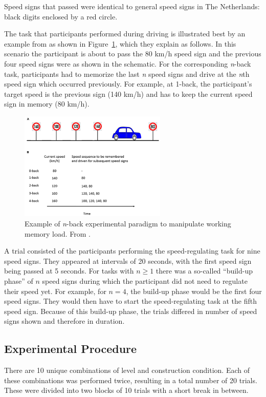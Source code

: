 Speed signs that passed were identical to general speed signs in The Netherlands: black digits enclosed by a red circle. 

The \nback task that participants performed during driving is illustrated best by an example from \citet{Unni2017} as shown in Figure~\ref{fig:nback_scheme}, which they explain as follows.
In this scenario the participant is about to pass the 80 km/h speed sign and the previous four speed signs were as shown in the schematic. 
For the corresponding \textit{n}-back task, participants had to memorize the last \textit{n} speed signs and drive at the \textit{n}th speed sign which occurred previously.
For example, at 1-back, the participant’s target speed is the previous sign (140 km/h) and has to keep the current speed sign in memory (80 km/h).

\begin{figure}
  \centering
  \includegraphics[width=7cm]{images/nback_Scheunemann.pdf}
  \caption{Example of \textit{n}-back experimental paradigm to manipulate working memory load. From \citet{Unni2017}.}
  \label{fig:nback_scheme}
\end{figure}

A trial consisted of the participants performing the speed-regulating task for nine speed signs. 
They appeared at intervals of 20 seconds, with the first speed sign being passed at 5 seconds.
For \nback tasks with \(n \geq 1\) there was a so-called ``build-up phase'' of \(n\) speed signs during which the participant did not need to regulate their speed yet. 
For example, for \(n = 4\), the build-up phase would be the first four speed signs. 
They would then have to start the speed-regulating task at the fifth speed sign.
Because of this build-up phase, the \nback trials differed in number of speed signs shown and therefore in duration.

\subsection{Experimental Procedure}
There are 10 unique combinations of \nback level and construction condition.
Each of these combinations was performed twice, resulting in a total number of 20 trials.
These were divided into two blocks of 10 trials with a short break in between.

